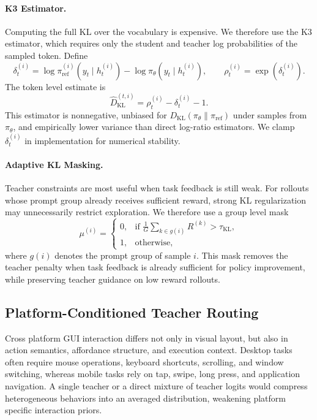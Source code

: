 \paragraph{K3 Estimator.}
Computing the full KL over the vocabulary is expensive. We therefore use
the K3 estimator, which requires only the student and teacher log
probabilities of the sampled token. Define
\begin{equation}
\delta_t^{(i)}
=
\log \pi_{\mathrm{ref}}^{(i)}(y_t \mid h_t^{(i)})
-
\log \pi_\theta(y_t \mid h_t^{(i)}),
\qquad
\rho_t^{(i)}=\exp(\delta_t^{(i)}).
\label{eq:k3_delta}
\end{equation}
The token level estimate is
\begin{equation}
\hat{D}_{\mathrm{KL}}^{(t,i)}
=
\rho_t^{(i)}-\delta_t^{(i)}-1.
\label{eq:k3_estimator}
\end{equation}
This estimator is nonnegative, unbiased for
$D_{\mathrm{KL}}(\pi_\theta\|\pi_{\mathrm{ref}})$ under samples from
$\pi_\theta$, and empirically lower variance than direct log-ratio
estimators. We clamp $\delta_t^{(i)}$ in implementation for numerical
stability.

\paragraph{Adaptive KL Masking.}
Teacher constraints are most useful when task feedback is still weak. For
rollouts whose prompt group already receives sufficient reward, strong KL
regularization may unnecessarily restrict exploration. We therefore use a
group level mask
\begin{equation}
\mu^{(i)}
=
\begin{cases}
0, & \text{if } \frac{1}{G}\sum_{k\in g(i)} R^{(k)}
> \tau_{\mathrm{KL}},\\
1, & \text{otherwise},
\end{cases}
\label{eq:kl_mask}
\end{equation}
where $g(i)$ denotes the prompt group of sample $i$. This mask removes the
teacher penalty when task feedback is already sufficient for
policy improvement, while preserving teacher guidance on low reward
rollouts.

\subsection{Platform-Conditioned Teacher Routing}
\label{sec:teacher_routing}

Cross platform GUI interaction differs not only in visual layout, but also
in action semantics, affordance structure, and execution context. Desktop
tasks often require mouse operations, keyboard shortcuts, scrolling, and
window switching, whereas mobile tasks rely on tap, swipe, long press, and
application navigation. A single teacher or a direct mixture of teacher
logits would compress heterogeneous behaviors into an averaged
distribution, weakening platform specific interaction priors.

